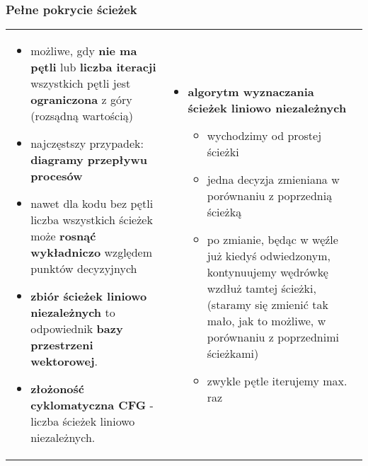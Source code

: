 \documentclass[../main.tex]{subfiles}
\begin{document}
    \subsubsection{Pełne pokrycie ścieżek}
    \begin{table}[H]
        \begin{center}
            \begin{tabular}{p{8cm} p{8cm}}
                \begin{itemize}
                    \item możliwe, gdy \textbf{nie ma pętli} lub \textbf{liczba iteracji} wszystkich pętli jest \textbf{ograniczona} z góry (rozsądną wartością)
                    \item najczęstszy przypadek: \textbf{diagramy przepływu procesów}
                    \item nawet dla kodu bez pętli liczba wszystkich ścieżek może \textbf{rosnąć wykładniczo} względem punktów decyzyjnych
                    \item \textbf{zbiór ścieżek liniowo niezależnych} to odpowiednik \textbf{bazy przestrzeni wektorowej}.
                    \item \textbf{złożoność cyklomatyczna CFG} - liczba ścieżek liniowo niezależnych.
                \end{itemize}
                &
                \begin{itemize}
                    \item \textbf{algorytm wyznaczania ścieżek liniowo niezależnych}
                    \begin{itemize}
                        \item wychodzimy od prostej ścieżki
                        \item jedna decyzja zmieniana w porównaniu z poprzednią ścieżką
                        \item po zmianie, będąc w węźle już kiedyś odwiedzonym, kontynuujemy wędrówkę wzdłuż tamtej ścieżki,
                        (staramy się zmienić tak mało, jak to możliwe, w porównaniu z poprzednimi ścieżkami)
                        \item zwykle pętle iterujemy max. raz
                    \end{itemize}
                \end{itemize}
            \end{tabular}
        \end{center}
    \end{table}
\end{document}
